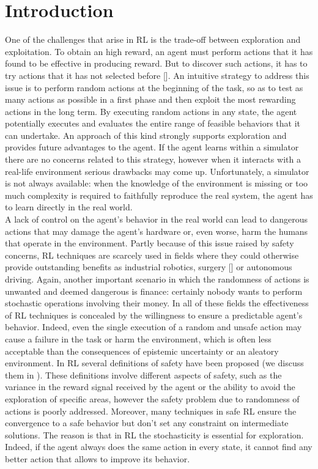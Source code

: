 \chapter{Introduction} \label{ch:intro}

One of the challenges that arise in \acf{RL} is the trade-off between exploration and exploitation. To obtain an high reward, an agent must perform actions that it has found to be effective in producing reward. But to discover such actions, it has to try actions that it has not selected before [\cite{sutton2018reinforcement}]. An intuitive strategy to address this issue is to perform random actions at the beginning of the task, so as to test as many actions as possible in a first phase and then exploit the most rewarding actions in the long term. By executing random actions in any state, the agent potentially executes and evaluates the entire range of feasible behaviors that it can undertake. An approach of this kind strongly supports exploration and provides future advantages to the agent. If the agent learns within a simulator there are no concerns related to this strategy, however when it interacts with a real-life environment serious drawbacks may come up. Unfortunately, a simulator is not always available: when the knowledge of the environment is missing or too much complexity is required to faithfully reproduce the real system, the agent has to learn directly in the real world. \\
\newline
A lack of control on the agent's behavior in the real world can lead to dangerous actions that may damage the agent's hardware or, even worse, harm the humans that operate in the environment. Partly because of this issue raised by safety concerns, \ac{RL} techniques are scarcely used in fields where they could otherwise provide outstanding benefits as industrial robotics, surgery [\cite{baek2018PathPlanning}] or autonomous driving. Again, another important scenario in which the randomness of actions is unwanted and deemed dangerous is finance: certainly nobody wants to perform stochastic operations involving their money. In all of these fields the effectiveness of \ac{RL} techniques is concealed by the willingness to ensure a predictable agent's behavior. Indeed, even the single execution of a random and unsafe action may cause a failure in the task or harm the environment, which is often less acceptable than the consequences of epistemic uncertainty or an aleatory environment. In \ac{RL} several definitions of safety have been proposed (we discuss them in ). These definitions involve different aspects of safety, such as the variance in the reward signal received by the agent or the ability to avoid the exploration of specific areas, however the safety problem due to randomness of actions is poorly addressed. Moreover, many techniques in safe \ac{RL} ensure the convergence to a safe behavior but don't set any constraint on intermediate solutions. The reason is that in \ac{RL} the stochasticity is essential for exploration. Indeed, if the agent always does the same action in every state, it cannot find any better action that allows to improve its behavior.\\
